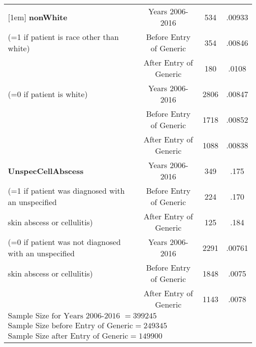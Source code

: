 \begin{table}[htbp]
\begin{tabular}{l*{3}{c}}
[1em]
\textbf{nonWhite}                                       &     Years 2006-2016&             534&      .00933\\
(=1 if patient is race other than white)                &     Before Entry of Generic&     354&      .00846\\
                                                        &     After Entry of Generic&      180&      .0108\\
[1em]
(=0 if patient is white)                                &     Years 2006-2016&             2806&      .00847\\
                                                        &     Before Entry of Generic&     1718&      .00852\\
                                                        &     After Entry of Generic&      1088&      .00838\\
[1em]
\textbf{UnspecCellAbscess}                              &     Years 2006-2016&             349 &      .175\\
(=1 if patient was diagnosed with an unspecified        &     Before Entry of Generic&     224 &      .170\\
 skin abscess or cellulitis)                            &     After Entry of Generic&      125  &      .184\\
[1em]
(=0 if patient was not diagnosed with an unspecified    &     Years 2006-2016&             2291 &      .00761\\
skin abscess or cellulitis)                             &     Before Entry of Generic&     1848 &      .0075\\
                                                        &     After Entry of Generic&      1143  &      .0078\\
\hline
$\text{Sample Size for Years 2006-2016 }= 399245$\\
$\text{Sample Size before Entry of Generic} = 249345$\\
$\text{Sample Size after Entry of Generic} = 149900$\\
\hline\hline
\end{tabular}
\label{tab:Table4.4}
\end{table}


